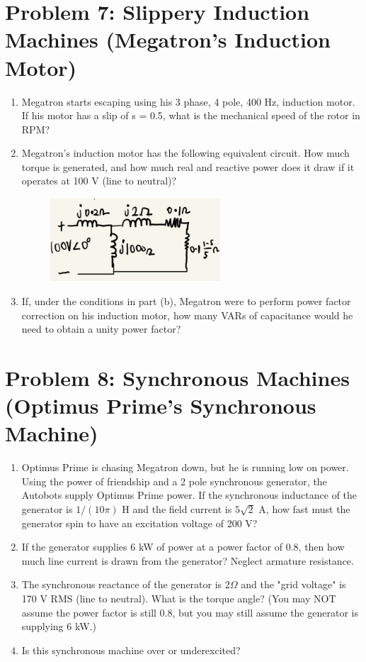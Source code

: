 \documentclass{article}
\begin{document}
\section*{Problem 7: Slippery Induction Machines (Megatron's Induction Motor)}  
\begin{enumerate}[label=(\alph*)]
    \item {Megatron starts escaping using his 3 phase, 4 pole, 400 Hz, induction motor.  If his motor has a slip of s = 0.5, what is the mechanical speed of the rotor in RPM?}
    \item {Megatron's induction motor has the following equivalent circuit. How much torque is generated, and how much real and reactive power does it draw if it operates at 100 V (line to neutral)?}
    \begin{figure}[H]
        \centering
        \includegraphics[width=0.6\textwidth]{figures/q7.PNG}
        \label{poletradsaj}
\end{figure}
    \item {If, under the conditions in part (b), Megatron were to perform power factor correction on his induction motor, how many VARs of capacitance would he need to obtain a unity power factor?}
\end{enumerate}
\newpage %
\noindent 
\section*{Problem 8: Synchronous Machines (Optimus Prime's Synchronous Machine)}  
\begin{enumerate}[label=(\alph*)]
    \item {Optimus Prime is chasing Megatron down, but he is running low on power. Using the power of friendship and a 2 pole synchronous generator, the Autobots supply Optimus Prime power. If the synchronous inductance of the generator is $1/(10\pi)$ H and the field current is $5\sqrt{2}$ A, how fast must the generator spin to have an excitation voltage of 200 V?}
    \item {If the generator supplies 6 kW of power at a power factor of 0.8, then how much line current is drawn from the generator? Neglect armature resistance.}
    \item {The synchronous reactance of the generator is 2$\Omega$ and the "grid voltage" is 170 V RMS (line to neutral). What is the torque angle? (You may NOT assume the power factor is still 0.8, but you may still assume the generator is supplying 6 kW.)}
    \item{Is this synchronous machine over or underexcited? }
\end{enumerate}
\newpage %
\noindent 
\end{document}
